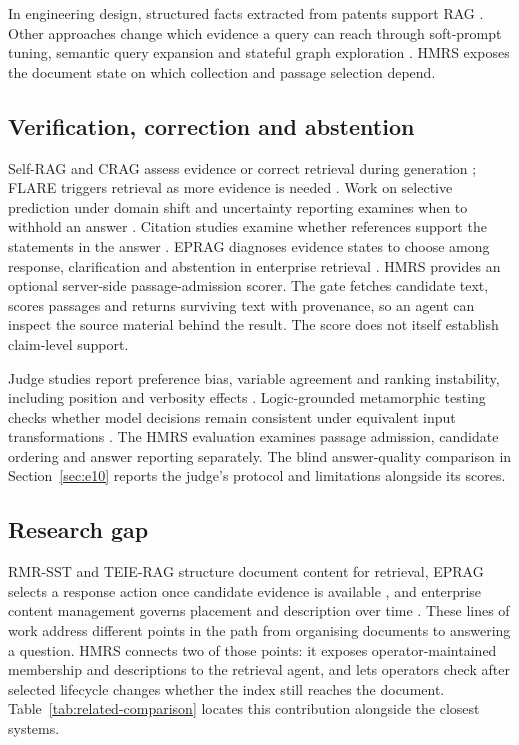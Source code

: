 In engineering design, structured facts extracted from patents support RAG
\citep{siddharth2024retrieval}. Other approaches change which evidence a
query can reach through soft-prompt tuning, semantic query expansion and
stateful graph exploration
\citep{peng2024soft,massai2023evaluatio,tao2025fine}. HMRS exposes the document
state on which collection and passage selection depend.

\subsection{Verification, correction and abstention}

Self-RAG and CRAG assess evidence or correct retrieval during generation
\citep{selfrag,crag}; FLARE triggers retrieval as more evidence is needed
\citep{flare}. Work on selective prediction under domain shift and
uncertainty reporting examines when to withhold an answer
\citep{kamath,feng-abstain,yin-knowwhat}. Citation studies examine whether
references support the statements in the answer
\citep{liu-verifiability,gao-citations}.
EPRAG diagnoses evidence states to choose among response, clarification and
abstention in enterprise retrieval \citep{kinalioglu-kbs-eprag-2026}.
HMRS provides an optional server-side passage-admission scorer. The gate
fetches candidate text, scores passages and returns surviving text with
provenance, so an agent can inspect the source material behind the result.
The score does not itself establish claim-level support.

Judge studies report preference bias, variable agreement and ranking
instability, including position and verbosity effects
\citep{zheng-llmjudge,sun-urara,panickssery-selfpref,wang-llmnotfair}.
Logic-grounded metamorphic testing checks whether model decisions remain
consistent under equivalent input transformations \citep{zhou2026lgmt}.
The HMRS evaluation examines passage admission, candidate ordering and
answer reporting separately. The blind answer-quality comparison in
Section~\ref{sec:e10} reports the judge's protocol and limitations
alongside its scores.

\subsection{Research gap}
\label{sec:gap}

RMR-SST and TEIE-RAG structure document content for retrieval, EPRAG
selects a response action once candidate evidence is available
\citep{li-kbs-rmrsst-2026,shen-kbs-teierag-2026,kinalioglu-kbs-eprag-2026},
and enterprise content management governs placement and description over
time \citep{paivarinta-ecm-2005,park-metadata-quality-2009}. These lines of
work address different points in the path from organising documents to
answering a question. HMRS connects two of those points: it exposes
operator-maintained membership and descriptions to the retrieval agent,
and lets operators check after selected lifecycle changes whether the
index still reaches the document. Table~\ref{tab:related-comparison}
locates this contribution alongside the closest systems.
